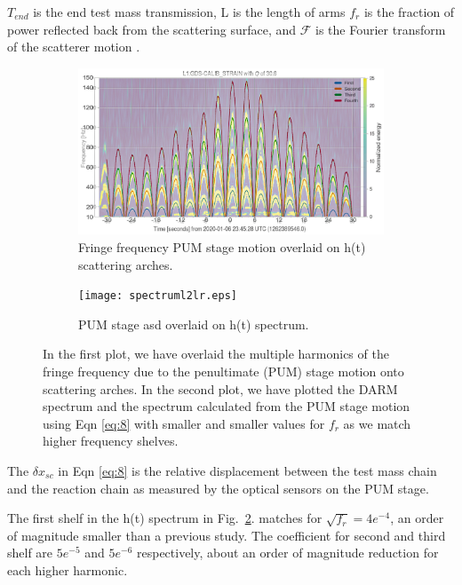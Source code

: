 \documentclass[12pt]{iopart}
\begin{document}
$T_{end}$ is the end test mass transmission, L is the length of arms $f_{r}$ is the fraction of power reflected back from the scattering surface, and $\mathcal{F}$ is the Fourier transform of the scatterer motion \cite{vaj_scat}.
\begin{figure}[h]
\captionsetup[subfigure]{font=scriptsize,labelfont=scriptsize}
   \centering
    \begin{subfigure}[b]{0.45\textwidth}
        \centering
         \includegraphics[width= \textwidth]{fringel2b_lr.jpg}
         \caption{Fringe frequency PUM stage motion overlaid on h(t) scattering arches.}
         \label{fig:fringel2}
    \end{subfigure}
    \hfill
    \begin{subfigure}[b]{0.45\textwidth}
        \centering
         \texttt{[image: spectruml2lr.eps]}
         \caption{PUM stage asd overlaid on h(t) spectrum.}
         \label{fig:spectruml2}
         
    
    \end{subfigure}
    \caption{In the first plot, we have overlaid the multiple harmonics of the fringe frequency due to the penultimate (PUM) stage motion onto scattering arches. In the second plot, we have plotted the DARM spectrum and the spectrum calculated from the PUM stage motion using Eqn \ref{eq:8} with smaller and smaller values for $f_{r}$ as we match higher frequency shelves.}
    \label{fig:fringespectrum}
    
\end{figure}

The $\delta x_{sc} $ in Eqn \ref{eq:8} is the relative displacement between the test mass chain and the reaction chain as measured by the optical sensors on the PUM stage. 

The first shelf in the h(t) spectrum in Fig.~\ref{fig:spectruml2}. matches for $\sqrt{f_{r}} = 4e^{-4}$, an order of magnitude smaller than a previous study\cite{hiro_calc}. The coefficient for second and third shelf are $5e^{-5}$ and $5e^{-6}$ respectively, about an order of magnitude reduction for each higher harmonic.
\end{document}
